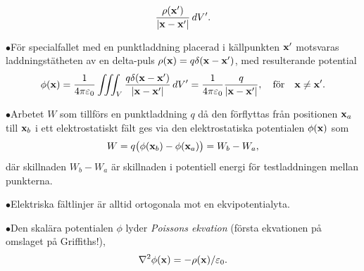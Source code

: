 {{$$        {{\rho({\bf x}')}\over{|{\bf x}-{\bf x}'|}}\,dV'.
  $$}
\item{$\bullet$}{F{\"o}r specialfallet med en punktladdning placerad i
  k{\"a}llpunkten ${\bf x}'$ motsvaras laddningst{\"a}theten av en
  delta-puls $\rho({\bf x})=q\delta({\bf x}-{\bf x}')$, med resulterande
  potential
  $$
    \phi({\bf x})
      ={{1}\over{4\pi\varepsilon_0}}\iiint_V
        {{q\delta({\bf x}-{\bf x}')}\over{|{\bf x}-{\bf x}'|}}\,dV'
      ={{1}\over{4\pi\varepsilon_0}}{{q}\over{|{\bf x}-{\bf x}'|}},
        \quad\hbox{f{\"o}r}\quad{\bf x}\ne{\bf x}'.
  $$}
\item{$\bullet$}{Arbetet $W$ som tillf{\"o}rs en punktladdning $q$ d{\aa}
  den f{\"o}rflyttas fr{\aa}n positionen ${\bf x}_a$ till ${\bf x}_b$
  i ett elektrostatiskt f{\"a}lt ges via den elektrostatiska potentialen
  $\phi({\bf x})$ som
  $$
    W=q\big(\phi({{\bf x}_b})-\phi({{\bf x}_a})\big)=W_b-W_a,
  $$
  d{\"a}r skillnaden $W_b-W_a$ {\"a}r skillnaden i potentiell energi f{\"o}r
  testladdningen mellan punkterna.}
\item{$\bullet$}{Elektriska f{\"a}ltlinjer {\"a}r alltid ortogonala mot
  en ekvipotentialyta.}
\item{$\bullet$}{Den skal{\"a}ra potentialen $\phi$ lyder {\it Poissons
  ekvation} (f{\"o}rsta ekvationen p{\aa} omslaget p{\aa} Griffiths!),
  $$
    \nabla^2\phi({\bf x})=-\rho({\bf x})/\varepsilon_0.
  $$}

}
